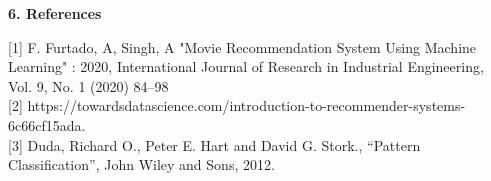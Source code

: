 \documentclass{article}
\begin{document}
\begin{flushleft}
\textbf{\large 6. References}
\end{flushleft}

[1] F. Furtado, A, Singh, A "Movie Recommendation System Using Machine Learning" : 2020, International Journal of Research in Industrial Engineering, Vol. 9, No. 1 (2020) 84–98  \\

[2] https://towardsdatascience.com/introduction-to-recommender-systems-6c66cf15ada.\\

[3] Duda, Richard O., Peter E. Hart and David G. Stork., “Pattern Classification”, John Wiley and Sons, 2012.\\
\end{document}
